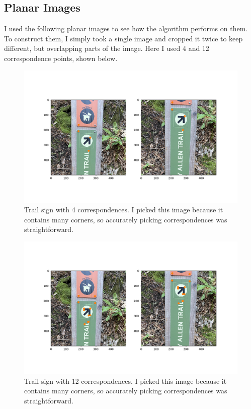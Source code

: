 \documentclass[]{article}
\begin{document}
	\subsection{Planar Images}
		I used the following planar images to see how the algorithm performs on them. To construct them, I simply took a single image and cropped it twice to keep different, but overlapping parts of the image. Here I used 4 and 12 correspondence points, shown below.
		
		\begin{figure}[H]
			\centering
			\includegraphics[width=6.5in]{test_images/sign_4_correspondences.png}
			\caption{Trail sign with 4 correspondences. I picked this image because it contains many corners, so accurately picking correspondences was straightforward.}
		\end{figure}
		
		\begin{figure}[H]
			\centering
			\includegraphics[width=6.5in]{test_images/sign_12_correspondences.png}
			\caption{Trail sign with 12 correspondences. I picked this image because it contains many corners, so accurately picking correspondences was straightforward.}
		\end{figure}
	
\end{document}
